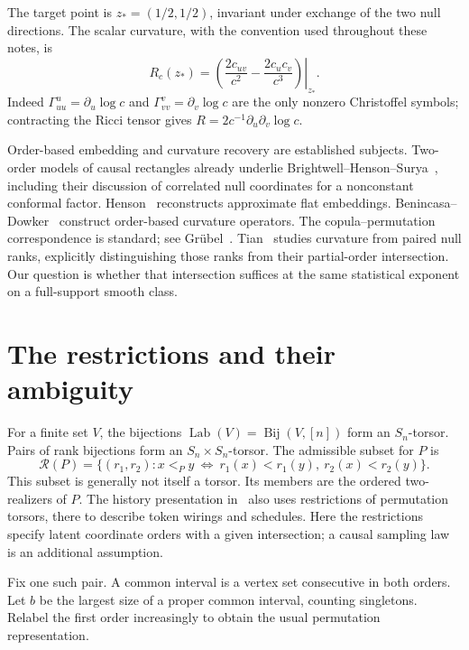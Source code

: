 \documentclass[11pt]{article}
\theoremstyle{remark}
\newcommand{\Lab}{\operatorname{Lab}}
\numberwithin{equation}{section}
\begin{document}
The target point is $z_*=(1/2,1/2)$, invariant under exchange of the
two null directions. The scalar curvature, with the convention used
throughout these notes, is
\begin{equation}\label{eq:curvature}
 R_c(z_*)=\left.
 \left(\frac{2c_{uv}}{c^2}-\frac{2c_uc_v}{c^3}\right)\right|_{z_*}.
\end{equation}
Indeed $\Gamma^u_{uu}=\partial_u\log c$ and
$\Gamma^v_{vv}=\partial_v\log c$ are the only nonzero Christoffel
symbols; contracting the Ricci tensor gives
$R=2c^{-1}\partial_u\partial_v\log c$.

Order-based embedding and curvature recovery are established subjects.
Two-order models of causal rectangles already underlie
Brightwell--Henson--Surya~\cite{BHS}, including their discussion of
correlated null coordinates for a nonconstant conformal factor.
Henson~\cite{Henson} reconstructs approximate flat embeddings.
Benincasa--Dowker~\cite{BD} construct order-based curvature operators.
The copula--permutation correspondence is standard; see
Gr\"ubel~\cite{Grubel}. Tian~\cite{Tian} studies curvature from paired
null ranks, explicitly distinguishing those ranks from their partial-order
intersection. Our question is whether that intersection suffices at the
same statistical exponent on a full-support smooth class.

\section{The restrictions and their ambiguity}
For a finite set $V$, the bijections $\Lab(V)=\operatorname{Bij}(V,[n])$
form an $S_n$-torsor. Pairs of rank bijections form an
$S_n\times S_n$-torsor. The admissible subset for $P$ is
\[
 \mathcal R(P)=\{(r_1,r_2):
       x<_Py\ \Longleftrightarrow\
       r_1(x)<r_1(y),\ r_2(x)<r_2(y)\}.
\]
This subset is generally not itself a torsor.
Its members are the ordered two-realizers of $P$.
The history presentation in~\cite{History} also uses restrictions of
permutation torsors, there to describe token wirings and schedules.
Here the restrictions specify latent coordinate orders with a given
intersection; a causal sampling law is an additional assumption.

Fix one such pair. A common interval is a vertex set consecutive in both
orders. Let $b$ be the largest size of a proper common interval,
counting singletons. Relabel the first order increasingly to obtain
the usual permutation representation.
\end{document}

